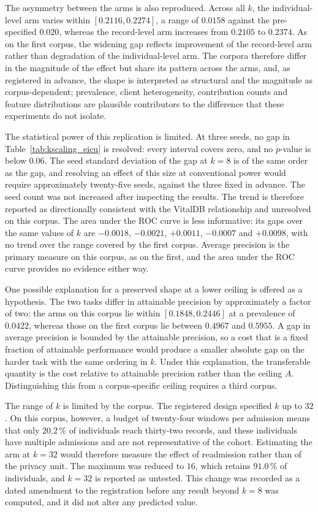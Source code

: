 The asymmetry between the arms is also reproduced. Across all $k$, the
individual-level arm varies within $[0.2116, 0.2274]$, a range of $0.0158$
against the pre-specified $0.020$, whereas the record-level arm increases from
$0.2105$ to $0.2374$. As on the first corpus, the widening gap reflects
improvement of the record-level arm rather than degradation of the
individual-level arm. The corpora therefore differ in the magnitude of the
effect but share its pattern across the arms, and, as registered in advance,
the shape is interpreted as structural and the magnitude as corpus-dependent;
prevalence, client heterogeneity, contribution counts and feature
distributions are plausible contributors to the difference that these
experiments do not isolate.

The statistical power of this replication is limited. At three seeds, no gap in
Table~\ref{tab:kscaling_eicu} is resolved: every interval covers zero, and no
$p$-value is below $0.06$. The seed standard deviation of the gap at $k = 8$ is
of the same order as the gap, and resolving an effect of this size at
conventional power would require approximately twenty-five seeds, against the three
fixed in advance. The seed count was not increased after inspecting the
results. The trend is therefore reported as directionally consistent with the
VitalDB relationship and unresolved on this corpus. The area under the ROC curve is
less informative: its gaps over the same values of $k$ are $-0.0018$,
$-0.0021$, $+0.0011$, $-0.0007$ and $+0.0098$, with no trend over the range
covered by the first corpus. Average precision is the primary measure on this
corpus, as on the first, and the area under the ROC curve provides no evidence
either way.

One possible explanation for a preserved shape at a lower ceiling is offered as
a hypothesis. The two tasks differ in attainable precision by approximately a
factor of two: the arms on this corpus lie within $[0.1848, 0.2446]$ at a
prevalence of $0.0422$, whereas those on the first corpus lie between $0.4967$
and $0.5955$. A gap in average precision is bounded by the attainable
precision, so a cost that is a fixed fraction of attainable performance would
produce a smaller absolute gap on the harder task with the same ordering in
$k$. Under this explanation, the transferable quantity is the cost relative to
attainable precision rather than the ceiling $A$. Distinguishing this from a
corpus-specific ceiling requires a third corpus.

The range of $k$ is limited by the corpus. The registered design specified $k$
up to $32$. On this corpus, however, a budget of twenty-four windows per
admission means that only $20.2\,\%$ of individuals reach thirty-two records,
and these individuals have multiple admissions and are not representative of
the cohort. Estimating the arm at $k = 32$ would therefore measure the effect
of readmission rather than of the privacy unit. The maximum was reduced to
$16$, which retains $91.0\,\%$ of individuals, and $k = 32$ is reported as
untested. This change was recorded as a dated amendment to the registration
before any result beyond $k = 8$ was computed, and it did not alter any
predicted value.

